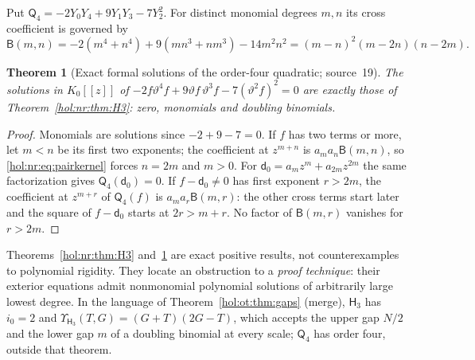 \documentclass[11pt]{article}
\numberwithin{equation}{section}
\newtheorem{theorem}{Theorem}[section]
\theoremstyle{definition}
\theoremstyle{remark}
\begin{document}
Put $\mathsf Q_4=-2Y_0Y_4+9Y_1Y_3-7Y_2^2$. For distinct monomial degrees $m,n$
its cross coefficient is governed by
\begin{equation}\label{hol:nr:eq:pairkernel}
 \mathsf B(m,n)=-2(m^4+n^4)+9(mn^3+nm^3)-14m^2n^2=(m-n)^2(m-2n)(n-2m).
\end{equation}

\begin{theorem}[Exact formal solutions of the order-four quadratic;
source~19]\label{hol:nr:thm:Q4}
The solutions in $K_0[[z]]$ of
$-2f\vartheta^4f+9\vartheta f\,\vartheta^3f-7(\vartheta^2f)^2=0$ are exactly
those of Theorem~\ref{hol:nr:thm:H3}: zero, monomials and doubling binomials.
\end{theorem}

\begin{proof}
Monomials are solutions since $-2+9-7=0$. If $f$ has two terms or more, let
$m<n$ be its first two exponents; the coefficient at $z^{m+n}$ is
$a_ma_n\mathsf B(m,n)$, so \eqref{hol:nr:eq:pairkernel} forces $n=2m$ and
$m>0$. For $\mathsf d_0=a_mz^m+a_{2m}z^{2m}$ the same factorization gives
$\mathsf Q_4(\mathsf d_0)=0$. If $f-\mathsf d_0\ne0$ has first exponent
$r>2m$, the coefficient at $z^{m+r}$ of $\mathsf Q_4(f)$ is $a_ma_r\mathsf
B(m,r)$: the other cross terms start later and the square of $f-\mathsf d_0$
starts at $2r>m+r$. No factor of $\mathsf B(m,r)$ vanishes for $r>2m$.
\end{proof}

Theorems~\ref{hol:nr:thm:H3} and~\ref{hol:nr:thm:Q4} are exact positive
results, not counterexamples to polynomial rigidity. They locate an obstruction
to a \emph{proof technique}: their exterior equations admit nonmonomial
polynomial solutions of arbitrarily large lowest degree. In the language of
Theorem~\ref{hol:ot:thm:gaps} (merge), $\mathsf H_3$ has $i_0=2$ and
$\Upsilon_{\mathsf H_3}(T,G)=(G+T)(2G-T)$, which accepts the upper gap $N/2$
and the lower gap $m$ of a doubling binomial at every scale; $\mathsf Q_4$ has
order four, outside that theorem.
\end{document}
